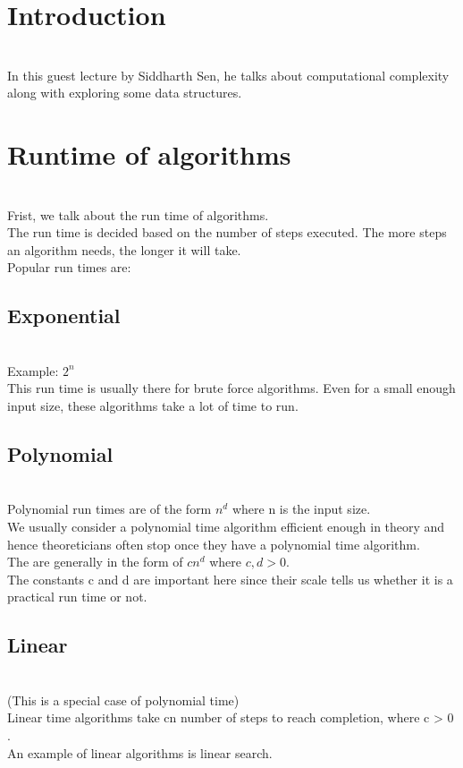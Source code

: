 


\maketitle

\section{Introduction}
\\ In this guest lecture by Siddharth Sen, he talks about computational complexity along with exploring some data structures.
\section{ Runtime of algorithms}
\\Frist, we talk about the run time of algorithms.
\\ The run time is decided based on the number of steps executed. The more steps an algorithm needs, the longer it will take.
\\Popular run times are:
\subsection{Exponential} 
\\ Example: $2^n$
\\ This run time is usually there for brute force algorithms. Even for a small enough input size, these algorithms take a lot of time to run.
\subsection{Polynomial} 
\\ Polynomial run times are of the form $n^d$ where n is the input size.
\\ We usually consider a polynomial time algorithm efficient enough in theory and hence theoreticians often stop once they have a polynomial time algorithm.
\\ The are generally in the form of $cn^d$ where $c,d>0$.
\\ The constants c and d are important here since their scale tells us whether it is a practical run time or not.
\subsection{Linear}
\\(This is a special case of polynomial time)
\\ Linear time algorithms take cn number of steps to reach completion, where c > 0 .
\\ An example of linear algorithms is linear search.
